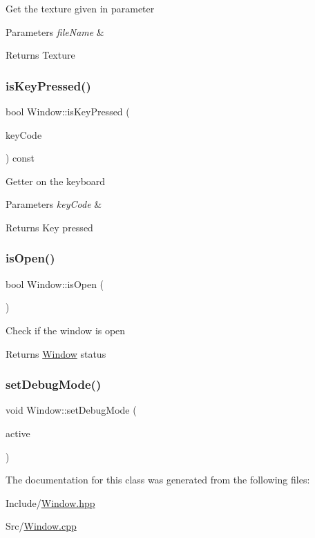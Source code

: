 Get the texture given in parameter 
\begin{DoxyParams}{Parameters}
{\em file\+Name} & \\
\hline
\end{DoxyParams}
\begin{DoxyReturn}{Returns}
Texture 
\end{DoxyReturn}
\mbox{\label{class_window_af32614f32f93231fb30d8cb59cafce28}} 
\subsubsection{\texorpdfstring{isKeyPressed()}{isKeyPressed()}}
{\footnotesize\ttfamily bool Window\+::is\+Key\+Pressed (\begin{DoxyParamCaption}\item[{const irr\+::\+E\+K\+E\+Y\+\_\+\+C\+O\+DE \&}]{key\+Code }\end{DoxyParamCaption}) const}

Getter on the keyboard 
\begin{DoxyParams}{Parameters}
{\em key\+Code} & \\
\hline
\end{DoxyParams}
\begin{DoxyReturn}{Returns}
Key pressed 
\end{DoxyReturn}
\mbox{\label{class_window_a0530ead23b2c91ef90a5f98e4df41cb8}} 
\subsubsection{\texorpdfstring{isOpen()}{isOpen()}}
{\footnotesize\ttfamily bool Window\+::is\+Open (\begin{DoxyParamCaption}{ }\end{DoxyParamCaption})}

Check if the window is open \begin{DoxyReturn}{Returns}
\mbox{\hyperlink{class_window}{Window}} status 
\end{DoxyReturn}
\mbox{\label{class_window_af3da99bf3e2c951b6600e5218de588b1}} 
\subsubsection{\texorpdfstring{setDebugMode()}{setDebugMode()}}
{\footnotesize\ttfamily void Window\+::set\+Debug\+Mode (\begin{DoxyParamCaption}\item[{const bool \&}]{active }\end{DoxyParamCaption})}



The documentation for this class was generated from the following files\+:\begin{DoxyCompactItemize}
\item 
Include/\mbox{\hyperlink{_window_8hpp}{Window.\+hpp}}\item 
Src/\mbox{\hyperlink{_window_8cpp}{Window.\+cpp}}\end{DoxyCompactItemize}
